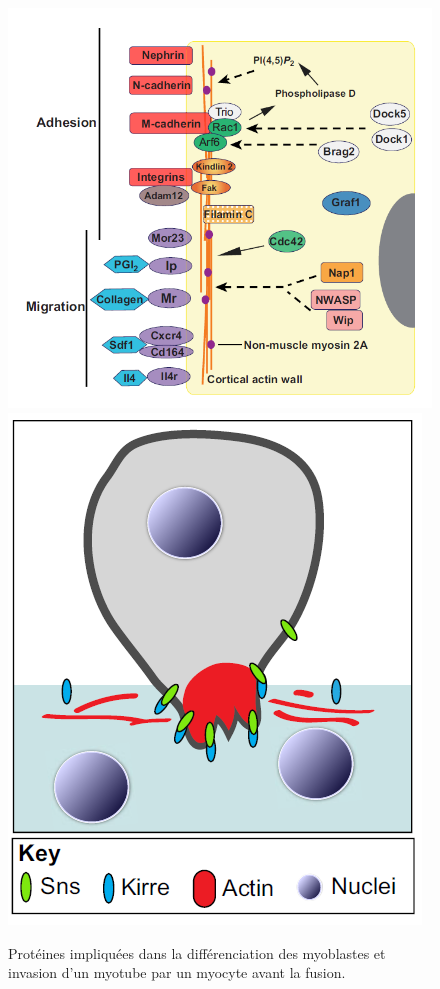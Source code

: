 \begin{figure}
\includegraphics[scale=0.3]{Figures/Myoblast_pathways.png} 
\includegraphics[scale=0.3]{Figures/Myoblast_invasion.png} 
\caption{Protéines impliquées dans la différenciation des myoblastes et invasion d'un myotube par un myocyte avant la fusion.}
\end{figure}

